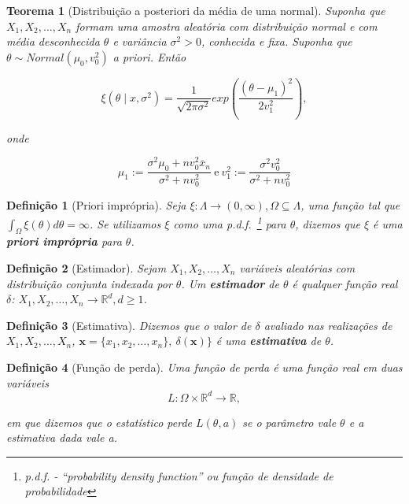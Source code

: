 \documentclass{article}
\newtheorem{theorem}{Teorema}
\newtheorem{definition}{Definição}
\begin{document}
\begin{theorem}[Distribuição a posteriori da média de uma normal]
Suponha que $X_1, X_2, \ldots, X_n$ formam uma amostra aleatória com distribuição normal e com média desconhecida $\theta$ e variância $\sigma^2 > 0$, conhecida e fixa. Suponha que $\theta \sim Normal(\mu_0, v_0^2)$ a priori. Então

\begin{equation}
\xi (\theta \mid x, \sigma^2) = \frac{1}{\sqrt{2 \pi \sigma^2}} exp \left (\frac{(\theta - \mu_1)^2}{2v_1^2}\right ),
\end{equation}

onde

\begin{equation}
\mu_1 := \frac{\sigma^2 \mu_0 + n v_0^2 \overline{x}_n}{\sigma^2 + n v_ 0^2} \ \mathrm{e} \ v_1^2 := \frac{\sigma^2 v_0^2}{\sigma^2 + n v_0^2}
\end{equation}
\end{theorem}

\begin{definition}[Priori imprópria]
Seja $\xi : \Lambda \rightarrow (0, \infty), \Omega \subseteq \Lambda$, uma função tal que $\int_\Omega \xi(\theta) d \theta = \infty$. Se utilizamos $\xi$ como uma p.d.f.~\footnote{p.d.f. - ``probability density function'' ou função de densidade de probabilidade} para $\theta$, dizemos que $\xi$ é uma \textbf{priori imprópria} para $\theta$.
\end{definition}

\begin{definition}[Estimador]
Sejam $X_1, X_2, \ldots, X_n$ variáveis aleatórias com distribuição conjunta indexada por $\theta$. Um \textbf{estimador} de $\theta$ é qualquer função real $\delta$: $X_1, X_2, \ldots, X_n \rightarrow \mathbb{R}^d, d \geq 1$.
\end{definition}

\begin{definition}[Estimativa]
Dizemos que o valor de $\delta$ avaliado nas realizações de $X_1, X_2, \ldots, X_n$, $\textbf{x} = \{x_1, x_2, \ldots, x_n\}, \ \delta(\textbf{x})\}$ é uma \textbf{estimativa} de $\theta$.
\end{definition}

\begin{definition}[Função de perda]
Uma função de perda é uma função real em duas variáveis 
\begin{equation}
L: \Omega \times \mathbb{R}^d \rightarrow \mathbb{R},
\end{equation}

em que dizemos que o estatístico \textit{perde} $L(\theta, a)$ se o parâmetro vale $\theta$ e a estimativa dada vale a.
\end{definition}
\end{document}
